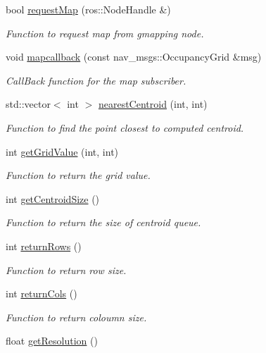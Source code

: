 \begin{DoxyCompactItemize}
bool \hyperlink{classmap_ad0c8afa9f68ede5257f5b7b2d33b093f}{request\+Map} (ros\+::\+Node\+Handle \&)
\begin{DoxyCompactList}\small\item\em Function to request map from gmapping node. \end{DoxyCompactList}\item 
void \hyperlink{classmap_ad3a6b0b96fc74179816e7a4ed785fc4d}{mapcallback} (const nav\+\_\+msgs\+::\+Occupancy\+Grid \&msg)
\begin{DoxyCompactList}\small\item\em Call\+Back function for the map subscriber. \end{DoxyCompactList}\item 
std\+::vector$<$ int $>$ \hyperlink{classmap_a69743a83eb45ec5cef3fbc07aae26427}{nearest\+Centroid} (int, int)
\begin{DoxyCompactList}\small\item\em Function to find the point closest to computed centroid. \end{DoxyCompactList}\item 
int \hyperlink{classmap_a696bcdd2197355d1ff65e6fdf90cad46}{get\+Grid\+Value} (int, int)
\begin{DoxyCompactList}\small\item\em Function to return the grid value. \end{DoxyCompactList}\item 
int \hyperlink{classmap_af9092b505e0d7f793322c7a481e3ca88}{get\+Centroid\+Size} ()
\begin{DoxyCompactList}\small\item\em Function to return the size of centroid queue. \end{DoxyCompactList}\item 
int \hyperlink{classmap_a665740b6cec1d2fac63bf1a9985e9628}{return\+Rows} ()
\begin{DoxyCompactList}\small\item\em Function to return row size. \end{DoxyCompactList}\item 
int \hyperlink{classmap_abffb3a9e6f9e18a73695b62e42d0811c}{return\+Cols} ()
\begin{DoxyCompactList}\small\item\em Function to return coloumn size. \end{DoxyCompactList}\item 
float \hyperlink{classmap_abd2282cb63fd166dbf2e90f78f610953}{get\+Resolution} ()

\end{DoxyCompactItemize}
